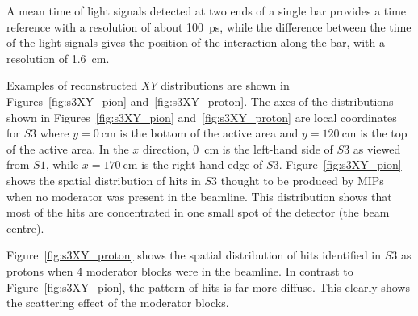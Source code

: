 A mean time of light signals detected at two ends of a single bar provides a time reference with a resolution of about 100~ps, while the difference between the time of the light signals gives the position of the interaction along the bar, with a resolution of 1.6~cm.

Examples of reconstructed $XY$ distributions are shown in Figures~\ref{fig:s3XY_pion} and~\ref{fig:s3XY_proton}.
The axes of the distributions shown in Figures~\ref{fig:s3XY_pion} and~\ref{fig:s3XY_proton} are local coordinates for $\mathit{S3}$ where $y=0~\text{cm}$ is the bottom of the active area and $y=120~\text{cm}$ is the top of the active area.
In the $x$ direction, 0~cm is the left-hand side of $\mathit{S3}$ as viewed from $\mathit{S1}$, while $x = 170~\text{cm}$ is the right-hand edge of $\mathit{S3}$.
Figure~\ref{fig:s3XY_pion} shows the spatial distribution of hits in $\mathit{S3}$ thought to be produced by MIPs when no moderator was present in the beamline.
This distribution shows that most of the hits are concentrated in one small spot of the detector (the beam centre).

Figure~\ref{fig:s3XY_proton} shows the spatial distribution of hits identified in $\mathit{S3}$ as protons when 4 moderator blocks were in the beamline.
In contrast to Figure~\ref{fig:s3XY_pion}, the pattern of hits is far more diffuse.
This clearly shows the scattering effect of the moderator blocks.


